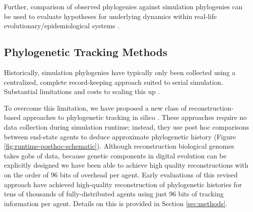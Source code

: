 Further, comparison of observed phylogenies against simulation phylogenies can be used to evaluate hypotheses for underlying dynamics within real-life evolutionary/epidemiological systems \citep{TODOtheGenevaHIVpaper}.

\subsection{Phylogenetic Tracking Methods}

Historically, simulation phylogenies have typically only been collected using a centralized, complete record-keeping approach suited to serial simulation.
Substantial limitations and costs to scaling this up \citep{morenoTODOpreprint}.



To overcome this limitation, we have proposed a new class of reconstruction-based approaches to phylogenetic tracking in silico \citep{moreno2022hereditary}.
These approaches require no data collection during simulation runtime; instead, they use post hoc comparisons between end-state agents to deduce approximate phylogenetic history (Figure \ref{fig:runtime-posthoc-schematic}).
Although reconstruction biological genomes takes gobs of data, because genetic components in digital evolution can be explicitly designed we have been able to achieve high quality reconstructions with on the order of 96 bits of overhead per agent.
Early evaluations of this revised approach have achieved high-quality reconstruction of phylogenetic histories for tens of thousands of fully-distributed agents using just 96 bits of tracking information per agent.
Details on this is provided in Section \ref{sec:methods}.
